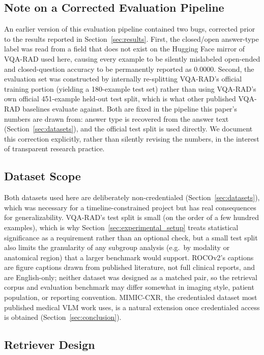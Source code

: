 \subsection{Note on a Corrected Evaluation Pipeline}

An earlier version of this evaluation pipeline contained two bugs,
corrected prior to the results reported in Section~\ref{sec:results}.
First, the closed/open answer-type label was read from a field that does
not exist on the Hugging Face mirror of VQA-RAD used here, causing every
example to be silently mislabeled open-ended and closed-question accuracy
to be permanently reported as 0.0000. Second, the evaluation set was
constructed by internally re-splitting VQA-RAD's official training
portion (yielding a 180-example test set) rather than using VQA-RAD's
own official 451-example held-out test split, which is what other
published VQA-RAD baselines evaluate against. Both are fixed in the
pipeline this paper's numbers are drawn from: answer type is recovered
from the answer text (Section~\ref{sec:datasets}), and the official test
split is used directly. We document this correction explicitly, rather
than silently revising the numbers, in the interest of transparent
research practice.

\subsection{Dataset Scope}

Both datasets used here are deliberately non-credentialed
(Section~\ref{sec:datasets}), which was necessary for a timeline-constrained
project but has real consequences for generalizability. VQA-RAD's test
split is small (on the order of a few hundred examples), which is why
Section~\ref{sec:experimental_setup} treats statistical significance as a
requirement rather than an optional check, but a small test split also
limits the granularity of any subgroup analysis (e.g.\ by modality or
anatomical region) that a larger benchmark would support. ROCOv2's captions
are figure captions drawn from published literature, not full clinical
reports, and are English-only; neither dataset was designed as a matched
pair, so the retrieval corpus and evaluation benchmark may differ somewhat
in imaging style, patient population, or reporting convention.
MIMIC-CXR, the credentialed dataset most published medical VLM work uses,
is a natural extension once credentialed access is obtained
(Section~\ref{sec:conclusion}).

\subsection{Retriever Design}

